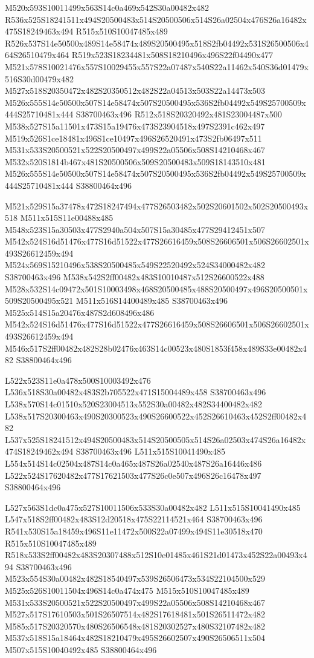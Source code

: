\documentclass{article}
\begin{document}
\begin{multicols}{2}
M520x593S10011499x563S14c0a469x542S30a00482x482 R536x525S18241511x494S20500483x514S20500506x514S26a02504x476S26a16482x475S18249463x494 R515x510S10047485x489 R526x537S14e50500x489S14e58474x489S20500495x518S2fb04492x531S26500506x464S26510479x464 R519x523S18234481x508S18210496x496S22f04490x477 M521x578S10021476x557S10029455x557S22a07487x540S22a11462x540S36d01479x516S30d00479x482 M527x518S20350472x482S20350512x482S22a04513x503S22a14473x503 M526x555S14e50500x507S14e58474x507S20500495x536S2fb04492x549S25700509x444S25710481x444 S38700463x496 R512x518S20320492x481S23004487x500 M538x527S15a11501x473S15a19476x473S23904518x497S2391c462x497 M519x526S1ce18481x496S1ce10497x496S26520491x473S2fb06497x511 M531x533S20500521x522S20500497x499S22a05506x508S14210468x467 M532x520S1814b467x481S20500506x509S20500483x509S18143510x481 M526x555S14e50500x507S14e58474x507S20500495x536S2fb04492x549S25700509x444S25710481x444 S38800464x496

M521x529S15a37478x472S18247494x477S26503482x502S20601502x502S20500493x518 M511x515S11e00488x485 M548x523S15a30503x477S2940a504x507S15a30485x477S29412451x507 M542x524S16d51476x477S16d51522x477S26616459x508S26606501x506S26602501x493S26612459x494 M524x569S15210496x538S20500485x549S22520492x524S34000482x482 S38700463x496 M538x542S2ff00482x483S10010487x512S26600522x488 M528x532S14c09472x501S10003498x468S20500485x488S20500497x496S20500501x509S20500495x521 M511x516S14400489x485 S38700463x496 M525x514S15a20476x487S2d608496x486 M542x524S16d51476x477S16d51522x477S26616459x508S26606501x506S26602501x493S26612459x494 M546x517S2ff00482x482S28b02476x463S14c00523x480S1853f458x489S33e00482x482 S38800464x496

L522x523S11e0a478x500S10003492x476 L536x518S30a00482x483S2b705522x471S15004489x458 S38700463x496 L538x570S14c01510x520S23004513x552S30a00482x482S34400482x482 L538x517S20300463x490S20300523x490S26600522x452S26610463x452S2ff00482x482 L537x525S18241512x494S20500483x514S20500505x514S26a02503x474S26a16482x474S18249462x494 S38700463x496 L511x515S10041490x485 L554x514S14c02504x487S14c0a465x487S26a02540x487S26a16446x486 L522x524S17620482x477S17621503x477S26c0e507x496S26c16478x497 S38800464x496

L527x563S1dc0a475x527S10011506x533S30a00482x482 L511x515S10041490x485 L547x518S2ff00482x483S12d20518x475S22114521x464 S38700463x496 R541x530S15a18459x496S11e11472x500S22a07499x494S11e30518x470 R515x510S10047485x489 R518x533S2ff00482x483S20307488x512S10e01485x461S21d01473x452S22a00493x494 S38700463x496 M523x554S30a00482x482S18540497x539S26506473x534S22104500x529 M525x526S10011504x496S14c0a474x475 M515x510S10047485x489 M531x533S20500521x522S20500497x499S22a05506x508S14210468x467 M527x517S17610503x501S26507514x482S17618481x501S26511472x482 M585x517S20320570x480S26506548x481S20302527x480S32107482x482 M537x518S15a18464x482S18210479x495S26602507x490S26506511x504 M507x515S10040492x485 S38800464x496


\end{multicols}
\end{document}
